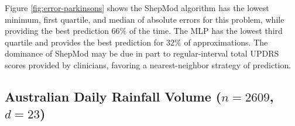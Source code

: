 \documentclass[smallextended,final]{svjour3}  %
\begin{document}
Figure \ref{fig:error-parkinsons} shows the ShepMod algorithm has the
lowest minimum, first quartile, and median of absolute errors for this
problem, while providing the best prediction $66\%$ of the time. The
MLP has the lowest third quartile and provides the best prediction for
$32\%$ of approximations. The dominance of ShepMod may be due in part
to regular-interval total UPDRS scores provided by clinicians,
favoring a nearest-neighbor strategy of prediction.



\subsection{Australian Daily Rainfall Volume ($n = 2609$, $d = 23$)}
\end{document}
